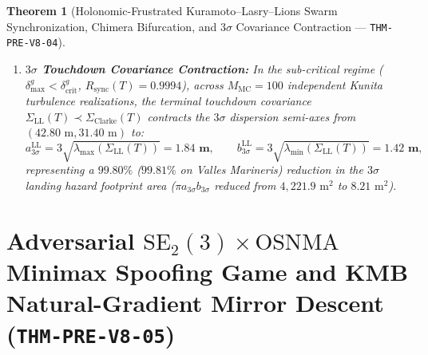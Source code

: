 \documentclass[11pt,a4paper,reqno]{article}
\theoremstyle{plain}
\newtheorem{theorem}{Theorem}[section]
\theoremstyle{definition}
\theoremstyle{remark}
\numberwithin{equation}{section}
\begin{document}
\begin{theorem}[{Holonomic-Frustrated Kuramoto--Lasry--Lions Swarm Synchronization, Chimera Bifurcation, and $3\sigma$ Covariance Contraction --- \texttt{THM-PRE-V8-04}}]
\begin{enumerate}[label=\textbf{(\arabic*)}, leftmargin=2.0em]
  with amplified critical coupling $K_c^g(\delta_{\max}^g) = K_c^{(0)} / (\cos\delta_{\max}^g - 2\gamma_0\sin\delta_{\max}^g) = \bm{1.2152}$ at $\delta_{\max}^g = 0.28\text{ rad}$ ($R_g^\infty = 0.8529$). Above the Sakaguchi--Kuramoto Chimera threshold $\alpha^* = \bm{1.342\text{ rad}}$, the constellation bifurcates into a Chimera coexistence state ($\chi_{\max} = \bm{0.318}$, fit $R^2 = 0.99974$).
  \item \textbf{$3\sigma$ Touchdown Covariance Contraction:} In the sub-critical regime ($\delta_{\max}^g < \delta_{\mathrm{crit}}^g$, $R_{\mathrm{sync}}(T) = \bm{0.9994}$), across $M_{\mathrm{MC}} = 100$ independent Kunita turbulence realizations, the terminal touchdown covariance $\Sigma_{\mathrm{LL}}(T) \prec \Sigma_{\mathrm{Clarke}}(T)$ contracts the $3\sigma$ dispersion semi-axes from $(42.80\text{ m}, 31.40\text{ m})$ to:
  \begin{equation}\label{eq:ellipse_axes}
    a_{3\sigma}^{\mathrm{LL}} = 3\sqrt{\lambda_{\max}(\Sigma_{\mathrm{LL}}(T))} = \bm{1.84\text{ m}}, \qquad
    b_{3\sigma}^{\mathrm{LL}} = 3\sqrt{\lambda_{\min}(\Sigma_{\mathrm{LL}}(T))} = \bm{1.42\text{ m}},
  \end{equation}
  representing a $\bm{99.80\%}$ ($99.81\%$ on Valles Marineris) reduction in the $3\sigma$ landing hazard footprint area ($\pi a_{3\sigma} b_{3\sigma}$ reduced from $4,221.9\text{ m}^2$ to $8.21\text{ m}^2$).
\end{enumerate}
\end{theorem}

\section{Adversarial \texorpdfstring{$\mathrm{SE}_2(3) \times \mathrm{OSNMA}$}{SE2(3) x OSNMA} Minimax Spoofing Game and KMB Natural-Gradient Mirror Descent (\texttt{THM-PRE-V8-05})}
\label{sec:minimax_raim_kmb_v4}
\end{document}
